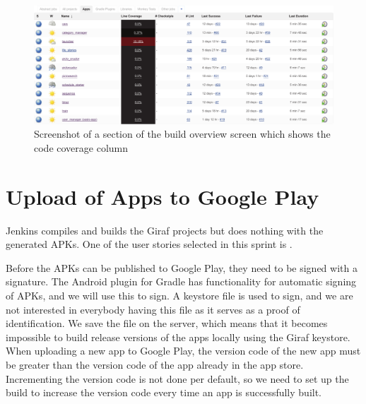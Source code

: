\begin{figure}[htbp]
    \includegraphics[width=\textwidth]{graphics/jenkins-overview-coco.pdf}
    \caption{Screenshot of a section of the build overview screen which shows the code coverage column}
    \label{fig:jenkins-overview-coco}
\end{figure}

\section{Upload of Apps to Google Play}\label{sec:upload_google_play}
Jenkins compiles and builds the Giraf projects but does nothing with the generated APKs. One of the user stories selected in this sprint is .

Before the APKs can be published to Google Play, they need to be signed with a signature. The Android plugin for Gradle has functionality for automatic signing of APKs, and we will use this to sign. A keystore file is used to sign, and we are not interested in everybody having this file as it serves as a proof of identification. We save the file on the server, which means that it becomes impossible to build release versions of the apps locally using the Giraf keystore. When uploading a new app to Google Play, the version code of the new app must be greater than the version code of the app already in the app store. Incrementing the version code is not done per default, so we need to set up the build to increase the version code every time an app is successfully built. 

